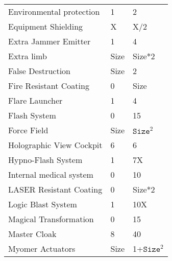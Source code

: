 \documentclass[twoside]{book}
\begin{document}
\begin{longtable}{p{1.25in}ll}
  \raggedright
           Environmental protection
           
  &
   1 
  &
   2 
  \tabularnewline
      
  \raggedright
           Equipment Shielding 
  &
   X 
  &
   X/2 
  \tabularnewline
      
  \raggedright
           Extra Jammer Emitter 
  &
   1 
  &
   4 
  \tabularnewline
      
  \raggedright
           Extra limb 
  &
   Size 
  &
   Size*2 
  \tabularnewline
      
  \raggedright
           False Destruction 
  &
   Size 
  &
   2 
  \tabularnewline
      
  \raggedright
           Fire Resistant Coating 
  &
   0 
  &
   Size 
  \tabularnewline
      
  \raggedright
           Flare Launcher 
  &
   1 
  &
   4 
  \tabularnewline
      
  \raggedright
           Flash System 
  &
   0 
  &
   15 
  \tabularnewline
      
  \raggedright
           Force Field 
  &
   Size 
  &
   \begin{math}{\texttt{Size}}^{2}\end{math} 
  \tabularnewline
      
  \raggedright
           Holographic View Cockpit
           
  &
   6 
  &
   6 
  \tabularnewline
      
  \raggedright
           Hypno-Flash System 
  &
   1 
  &
   7X 
  \tabularnewline
      
  \raggedright
           Internal medical system
           
  &
   0 
  &
   10 
  \tabularnewline
      
  \raggedright
           LASER Resistant Coating
           
  &
   0 
  &
   Size*2 
  \tabularnewline
      
  \raggedright
           Logic Blast System 
  &
   1 
  &
   10X 
  \tabularnewline
      
  \raggedright
           Magical Transformation 
  &
   0 
  &
   15 
  \tabularnewline
      
  \raggedright
           Master Cloak 
  &
   8 
  &
   40 
  \tabularnewline
      
  \raggedright
           Myomer Actuators 
  &
   Size 
  &
   1+\begin{math}{\texttt{Size}}^{2}\end{math} 
  \tabularnewline
      

\end{longtable}
\end{document}
